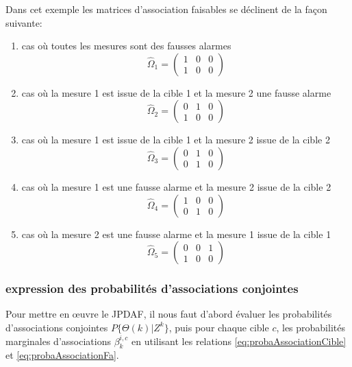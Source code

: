 \documentclass[10pt,french,a4paper]{report}
\begin{document}
Dans cet exemple les matrices d'association faisables se déclinent de la façon suivante:
\begin{enumerate}[label=\arabic*.]
\item cas où toutes les mesures sont des fausses alarmes 
 \begin{equation}
 	  \hat{\Omega}_1 =
 \begin{pmatrix}
 1 &0 &0\\
 1 &0 &0
 \end{pmatrix}
	  \end{equation}	
	  \item cas où la mesure 1 est issue de la cible 1 et la mesure 2 une fausse alarme
 \begin{equation}
 	  \hat{\Omega}_2 =
 \begin{pmatrix}
 0 & 1 &0\\
 1 &0 &0
 \end{pmatrix}
	  \end{equation}  
	  	  \item cas où la mesure 1 est issue de la cible 1 et la mesure 2 issue de la cible 2
 \begin{equation}
 	  \hat{\Omega}_3 =
 \begin{pmatrix}
 0 & 1 &0\\
 0 &1 &0
 \end{pmatrix}
	  \end{equation}  
	  	  	  \item cas où la mesure 1 est une fausse alarme et la mesure 2 issue de la cible 2
 \begin{equation}
 	  \hat{\Omega}_4 =
 \begin{pmatrix}
 1 &0 &0\\
 0 &1 &0
 \end{pmatrix}
 	  \end{equation}  
 	  	  	  \item cas où la mesure 2 est une fausse alarme et la mesure 1 issue de la cible 1
 \begin{equation}
 	  \hat{\Omega}_5 =
 \begin{pmatrix}
 0 &0 &1\\
 1 &0 &0
 \end{pmatrix}
	  \end{equation}  
	\end{enumerate} 
	
	\subsubsection{expression des probabilités d'associations conjointes} 
	Pour mettre en \oe uvre le \ac{JPDAF}, il nous faut d'abord évaluer les probabilités d'associations conjointes $P\{\Theta(k) | Z^k\}$, puis pour chaque cible $c$, les probabilités marginales d'associations $\beta^{i,c}_k$ en utilisant les relations \ref{eq:probaAssociationCible} et \ref{eq:probaAssociationFa}.
	
\end{document}
